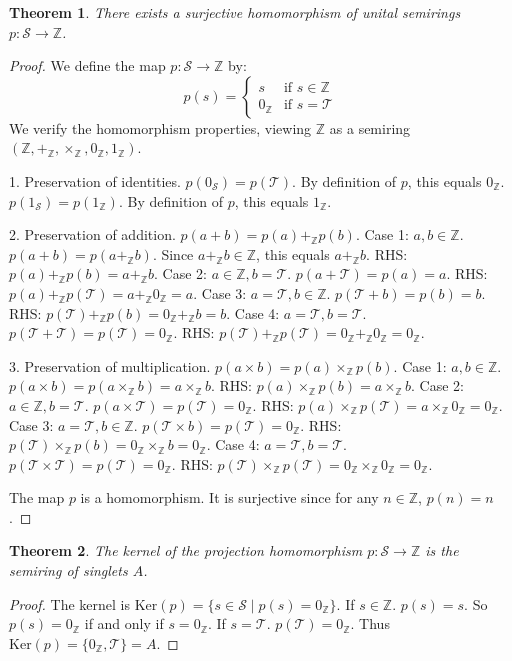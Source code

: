 \documentclass[11pt, a4paper]{article}
\theoremstyle{plain}
\newtheorem{theorem}{Theorem}[section]
\theoremstyle{definition}
\numberwithin{equation}{section}
\newcommand{\Z}{\mathbb{Z}}
\newcommand{\Tobj}{\mathcal{T}} %
\newcommand{\SemiringS}{\mathcal{S}}
\newcommand{\Ker}{\mathrm{Ker}}
\begin{document}
\begin{theorem}\label{thm:projection_S_to_Z}
There exists a surjective homomorphism of unital semirings $p: \SemiringS \to \Z$.
\end{theorem}
\begin{proof}
We define the map $p: \SemiringS \to \Z$ by:
\begin{equation}
    p(s) = \begin{cases}
        s & \text{if } s \in \Z \\
        0_{\Z} & \text{if } s=\Tobj
    \end{cases}
\end{equation}
We verify the homomorphism properties, viewing $\Z$ as a semiring $(\Z, +_{\Z}, \times_{\Z}, 0_{\Z}, 1_{\Z})$.

1. Preservation of identities.
$p(0_{\SemiringS}) = p(\Tobj)$. By definition of $p$, this equals $0_{\Z}$.
$p(1_{\SemiringS}) = p(1_{\Z})$. By definition of $p$, this equals $1_{\Z}$.

2. Preservation of addition. $p(a+b) = p(a)+_{\Z} p(b)$.
Case 1: $a, b \in \Z$. $p(a+b) = p(a+_{\Z} b)$. Since $a+_{\Z} b \in \Z$, this equals $a+_{\Z} b$.
RHS: $p(a)+_{\Z} p(b) = a+_{\Z} b$.
Case 2: $a \in \Z, b=\Tobj$. $p(a+\Tobj) = p(a) = a$.
RHS: $p(a)+_{\Z} p(\Tobj) = a+_{\Z} 0_{\Z} = a$.
Case 3: $a=\Tobj, b \in \Z$. $p(\Tobj+b) = p(b) = b$.
RHS: $p(\Tobj)+_{\Z} p(b) = 0_{\Z}+_{\Z} b = b$.
Case 4: $a=\Tobj, b=\Tobj$. $p(\Tobj+\Tobj) = p(\Tobj) = 0_{\Z}$.
RHS: $p(\Tobj)+_{\Z} p(\Tobj) = 0_{\Z}+_{\Z} 0_{\Z} = 0_{\Z}$.

3. Preservation of multiplication. $p(a\times b) = p(a)\times_{\Z} p(b)$.
Case 1: $a, b \in \Z$. $p(a\times b) = p(a\times_{\Z} b) = a\times_{\Z} b$.
RHS: $p(a)\times_{\Z} p(b) = a\times_{\Z} b$.
Case 2: $a \in \Z, b=\Tobj$. $p(a\times\Tobj) = p(\Tobj) = 0_{\Z}$.
RHS: $p(a)\times_{\Z} p(\Tobj) = a\times_{\Z} 0_{\Z} = 0_{\Z}$.
Case 3: $a=\Tobj, b \in \Z$. $p(\Tobj\times b) = p(\Tobj) = 0_{\Z}$.
RHS: $p(\Tobj)\times_{\Z} p(b) = 0_{\Z}\times_{\Z} b = 0_{\Z}$.
Case 4: $a=\Tobj, b=\Tobj$. $p(\Tobj\times\Tobj) = p(\Tobj) = 0_{\Z}$.
RHS: $p(\Tobj)\times_{\Z} p(\Tobj) = 0_{\Z}\times_{\Z} 0_{\Z} = 0_{\Z}$.

The map $p$ is a homomorphism. It is surjective since for any $n \in \Z$, $p(n)=n$.
\end{proof}

\begin{theorem}\label{thm:kernel_p_is_A}
The kernel of the projection homomorphism $p: \SemiringS \to \Z$ is the semiring of singlets $A$.
\end{theorem}
\begin{proof}
The kernel is $\Ker(p) = \{s \in \SemiringS \mid p(s)=0_{\Z}\}$.
If $s \in \Z$. $p(s)=s$. So $p(s)=0_{\Z}$ if and only if $s=0_{\Z}$.
If $s=\Tobj$. $p(\Tobj)=0_{\Z}$.
Thus $\Ker(p) = \{0_{\Z}, \Tobj\} = A$.
\end{proof}
\end{document}
